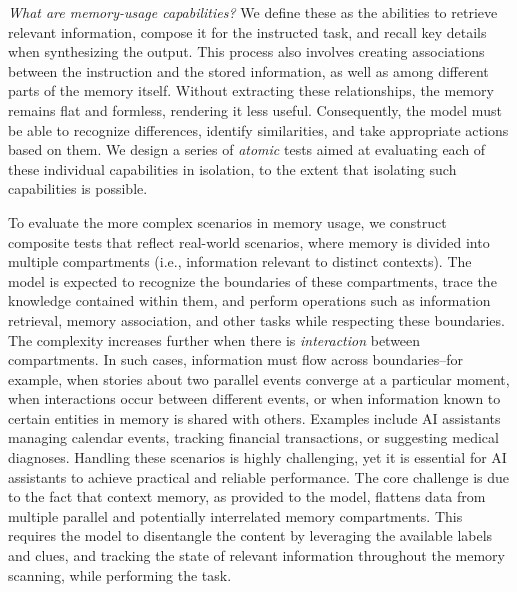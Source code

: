 \textit{What are memory-usage capabilities?} We define these as the abilities to retrieve relevant information, compose it for the instructed task, and recall key details when synthesizing the output. This process also involves creating associations between the instruction and the stored information, as well as among different parts of the memory itself. Without extracting these relationships, the memory remains flat and formless, rendering it less useful. Consequently, the model must be able to recognize differences, identify similarities, and take appropriate actions based on them. We design a series of \textit{atomic} tests aimed at evaluating each of these individual capabilities in isolation, to the extent that isolating such capabilities is possible.

To evaluate the more complex scenarios in memory usage, we construct composite tests that reflect real-world scenarios, where memory is divided into multiple compartments (i.e., information relevant to distinct contexts). The model is expected to recognize the boundaries of these compartments, trace the knowledge contained within them, and perform operations such as information retrieval, memory association, and other tasks while respecting these boundaries. The complexity increases further when there is \textit{interaction} between compartments. In such cases, information must flow across boundaries--for example, when stories about two parallel events converge at a particular moment, when interactions occur between different events, or when information known to certain entities in memory is shared with others. Examples include AI assistants managing calendar events, tracking financial transactions, or suggesting medical diagnoses. Handling these scenarios is highly challenging, yet it is essential for AI assistants to achieve practical and reliable performance. The core challenge is due to the fact that context memory, as provided to the model, flattens data from multiple parallel and potentially interrelated memory compartments. This requires the model to disentangle the content by leveraging the available labels and clues, and tracking the state of relevant information throughout the memory scanning, while performing the task.

